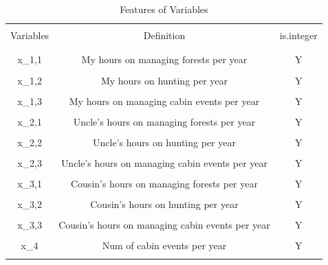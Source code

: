 \documentclass[fleqn,10pt]{wlscirep}
\begin{document}
\begin{table}[ht]
    \centering
    \begin{tabular}{C C c}
        \hline
        \\[-1em]
        Variables & Definition & is.integer \\
        \\[-1em]
        \hline
        \\[-1em]
        x_{1,1} & My hours on managing forests per year & Y \\
        \\[-1em]
        x_{1,2} & My hours on hunting per year & Y \\
        \\[-1em]
        x_{1,3} & My hours on managing cabin events per year & Y \\
        \\[-1em]
        x_{2,1} & Uncle's hours on managing forests per year & Y \\
        \\[-1em]
        x_{2,2} & Uncle's hours on hunting per year & Y \\
        \\[-1em]
        x_{2,3} & Uncle's hours on managing cabin events per year & Y \\
        \\[-1em]
        x_{3,1} & Cousin's hours on managing forests per year & Y \\
        \\[-1em]
        x_{3,2} & Cousin's hours on hunting per year & Y \\
        \\[-1em]
        x_{3,3} & Cousin's hours on managing cabin events per year & Y \\
        \\[-1em]
        x_{4} & Num of cabin events per year & Y \\
        \\[-1em]
        \hline
    \end{tabular}
    \caption{Features of Variables}
    \label{tab:1}
\end{table}
\FloatBarrier
\end{document}

